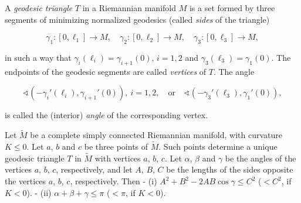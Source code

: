 A \emph{geodesic triangle} $T$ in a Riemannian manifold $M$ is a set formed by three
segments of minimizing normalized geodesics (called \emph{sides} of the triangle)

$$
\gamma_1:[0,\ell_1]\to M,\quad\gamma_2:[0,\ell_2]\to M,\quad\gamma_3:[0,\ell_3]\to M,
$$

in such a way that $\gamma_i(\ell_i)=\gamma_{i+1}(0)$, $i=1,2$ and
$\gamma_3(\ell_3)=\gamma_1(0)$. The endpoints of the geodesic segments are called
\emph{vertices} of $T$. The angle

$$
\sphericalangle(-\gamma_i'(\ell_i),\gamma_{i+1}'(0)),\ i=1,2,\quad\text{or}\quad\sphericalangle(-\gamma_3'(\ell_3),\gamma_1'(0)),
$$

is called the (interior) \emph{angle} of the corresponding vertex.

\begin{lemma}
  \label{lem:dc-ch12-3-1}
  Let $\tilde{M}$ be a complete simply connected Riemannian manifold, with curvature
  $K\leq 0$. Let $a$, $b$ and $c$ be three points of $\tilde{M}$. Such points
  determine a unique geodesic triangle $T$ in $\tilde{M}$ with vertices $a$, $b$,
  $c$. Let $\alpha$, $\beta$ and $\gamma$ be the angles of the vertices $a$, $b$,
  $c$, respectively, and let $A$, $B$, $C$ be the lengths of the sides opposite the
  vertices $a$, $b$, $c$, respectively. Then
  - (i) $A^2+B^2-2AB\cos\gamma\leq C^2$ ($<C^2$, if $K<0$).
  - (ii) $\alpha+\beta+\gamma\leq\pi$ ($<\pi$, if $K<0$).
\end{lemma}
